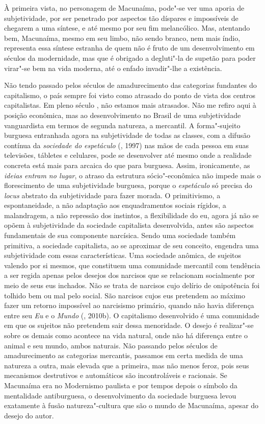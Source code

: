 À primeira vista, no personagem de Macunaíma, pode"-se ver uma aporia de
subjetividade, por ser penetrado por aspectos tão díspares e impossíveis
de chegarem a uma síntese, e até mesmo por seu fim melancólico. Mas,
atentando bem, Macunaíma, mesmo em seu limbo, não sendo branco, nem mais
índio, representa essa síntese estranha de quem não é fruto de um
desenvolvimento em séculos da modernidade, mas que é obrigado a
degluti"-la de supetão para poder virar"-se bem na vida moderna, até o
enfado invadir"-lhe a existência.

Não tendo passado pelos séculos de amadurecimento das categorias
fundantes do capitalismo, o país sempre foi visto como atrasado do ponto
de vista dos centros capitalistas. Em pleno século , não estamos mais
atrasados. Não me refiro aqui à posição econômica, mas ao
desenvolvimento no Brasil de uma subjetividade vanguardista em termos de
segunda natureza, a mercantil. A forma"-sujeito burguesa entranhada agora
na subjetividade de todas as classes, com a difusão contínua da
\emph{sociedade do espetáculo} (, 1997) nas mãos de cada pessoa em
suas televisões, tábletes e celulares, pode se desenvolver até mesmo
onde a realidade concreta está mais para arcaica do que para burguesa.
Assim, ironicamente, as \emph{ideias entram no lugar}, o atraso da
estrutura sócio"-econômica não impede mais o florescimento de uma
subjetividade burguesa, porque o \emph{espetáculo} só precisa do
\emph{locus} abstrato da subjetividade para fazer morada. O
primitivismo, a espontaneidade, a não adaptação aos enquadramentos
sociais rígidos, a malandragem, a não repressão dos instintos, a
flexibilidade do eu, agora já não se opõem à subjetividade da sociedade
capitalista desenvolvida, antes são aspectos fundamentais de sua
componente narcísica. Sendo uma sociedade também primitiva, a sociedade
capitalista, ao se aproximar de seu conceito, engendra uma subjetividade
com essas características. Uma sociedade anômica, de sujeitos valendo
por si mesmos, que constituem uma comunidade mercantil com tendência a
ser regida apenas pelos desejos dos narcisos que se relacionam
socialmente por meio de seus eus inchados. Não se trata de narcisos cujo
delírio de onipotência foi tolhido bem ou mal pelo social. São narcisos
cujos eus pretendem ao máximo fazer um retorno impossível ao narcisismo
primário, quando não havia diferença entre seu \emph{Eu} e o
\emph{Mundo} (, 2010b). O capitalismo desenvolvido é uma
comunidade em que os sujeitos não pretendem sair dessa menoridade. O
desejo é realizar"-se sobre os demais como acontece na vida natural, onde
não há diferença entre o animal e seu mundo, ambos naturais. Não
passando pelos séculos de amadurecimento as categorias mercantis,
passamos em certa medida de uma natureza a outra, mais elevada que a
primeira, mas não menos feroz, pois seus mecanismos destrutivos e
automáticos são incontroláveis e racionais. Se Macunaíma era no
Modernismo paulista e por tempos depois o símbolo da mentalidade
antiburguesa, o desenvolvimento da sociedade burguesa levou exatamente à
fusão natureza"-cultura que são o mundo de Macunaíma, apesar do desejo do
autor.

